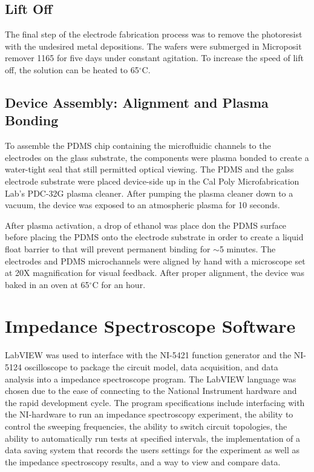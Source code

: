 \subsection*{Lift Off}

The final step of the electrode fabrication process was to remove the photoresist with the undesired metal depositions. The wafers were submerged in Microposit remover 1165 for five days under constant agitation. To increase the speed of lift off, the solution can be heated to 65$^\circ$C.

\subsection{Device Assembly: Alignment and Plasma Bonding}
\par To assemble the PDMS chip containing the microfluidic channels to the electrodes on the glass substrate, the components were plasma bonded to create a water-tight seal that still permitted optical viewing. The PDMS and the galss electrode substrate were placed device-side up in the Cal Poly Microfabrication Lab's PDC-32G plasma cleaner. After pumping the plasma cleaner down to a vacuum, the device was exposed to an atmospheric plasma for 10 seconds.  

\par After plasma activation, a drop of ethanol was place don the PDMS surface before placing the PDMS onto the electrode substrate in order to create a liquid float barrier to that will prevent permanent binding for $\sim$5 minutes. The electrodes and PDMS microchannels were aligned by hand with a microscope set at 20X magnification for visual feedback. After proper alignment, the device was baked in an oven at 65$^\circ$C for an hour. 





\section[IS Software]{Impedance Spectroscope Software}
\par LabVIEW was used to interface with the NI-5421 function generator and the NI-5124 oscilloscope to package the circuit model, data acquisition, and data analysis into a impedance spectroscope program. The LabVIEW language was chosen due to the ease of connecting to the National Instrument hardware and the rapid development cycle. The program specifications include interfacing with the NI-hardware to run an impedance spectroscopy experiment, the ability to control the sweeping frequencies, the ability to switch circuit topologies, the ability to automatically run tests at specified intervals, the implementation of a data saving system that records the users settings for the experiment as well as the impedance spectroscopy results, and a way to view and compare data.

